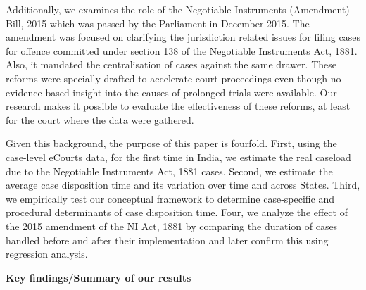 Additionally, we examines the role of the Negotiable Instruments (Amendment) Bill, 2015 which was passed by the Parliament in December 2015. The amendment was focused on clarifying the jurisdiction related issues for filing cases for offence committed under section 138 of the Negotiable Instruments Act, 1881. Also, it mandated the centralisation of cases against the same drawer. These reforms were specially drafted to accelerate court proceedings even though no evidence-based insight into the causes of prolonged trials were available. Our research makes it possible to evaluate the effectiveness of these reforms, at least for the court where the data were gathered.

Given this background, the purpose of this paper is fourfold. First, using the case-level eCourts data, for the first time in India, we estimate the real caseload due to the Negotiable Instruments Act, 1881 cases. Second, we estimate the average case disposition time and its variation over time and across States. Third, we empirically test our conceptual framework to determine case-specific and procedural determinants of case disposition time. Four, we analyze the effect of the 2015 amendment of the NI Act, 1881 by comparing the duration of cases handled before and after their implementation and later confirm this using regression analysis.


\textbf{Key findings/Summary of our results}

